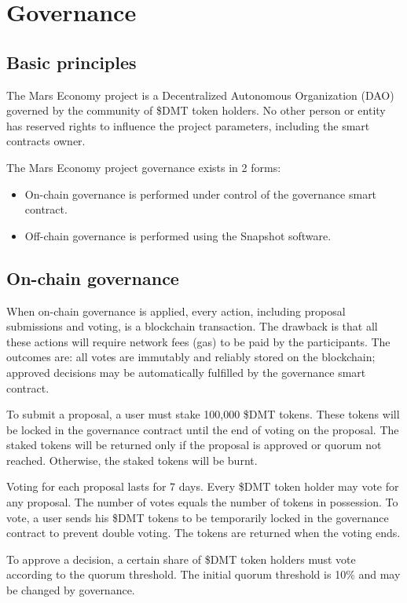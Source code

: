 \documentclass[12pt]{article}
\begin{document}
\section{Governance}

\subsection{Basic principles}
The Mars Economy project is a Decentralized Autonomous Organization (DAO) governed by the community of \$DMT token holders. No other person or entity has reserved rights to influence the project parameters, including the smart contracts owner.

The Mars Economy project governance exists in 2 forms:
\begin{itemize}
\item{On-chain governance} is performed under control of the governance smart contract.
\item{Off-chain governance} is performed using the Snapshot software.
\end{itemize}

\subsection{On-chain governance}
When on-chain governance is applied, every action, including proposal submissions and voting, is a blockchain transaction. The drawback is that all these actions will require network fees (gas) to be paid by the participants. The outcomes are: all votes are immutably and reliably stored on the blockchain; approved decisions may be automatically fulfilled by the governance smart contract.

To submit a proposal, a user must stake 100,000 \$DMT tokens. These tokens will be locked in the governance contract until the end of voting on the proposal. The staked tokens will be returned only if the proposal is approved or quorum not reached. Otherwise, the staked tokens will be burnt.

Voting for each proposal lasts for 7 days. Every \$DMT token holder may vote for any proposal. The number of votes equals the number of tokens in possession. To vote, a user sends his \$DMT tokens to be temporarily locked in the governance contract to prevent double voting. The tokens are returned when the voting ends.

To approve a decision, a certain share of \$DMT token holders must vote according to the quorum threshold. The initial quorum threshold is 10\% and may be changed by governance. 
\end{document}

